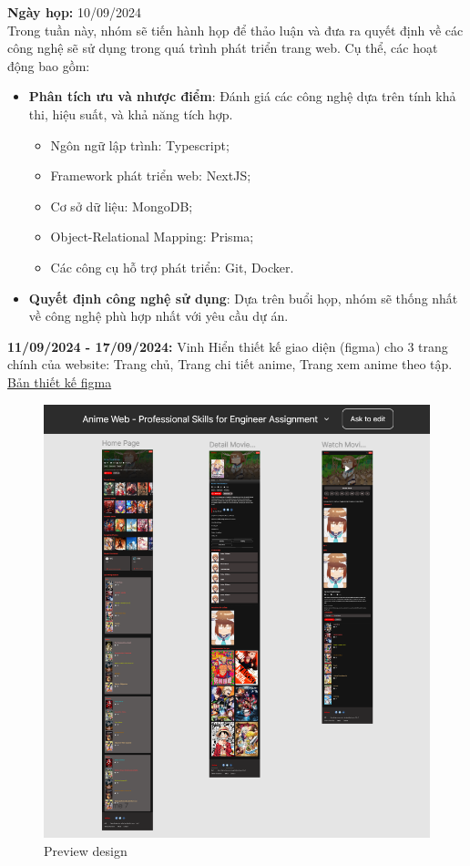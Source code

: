 \textbf{Ngày họp:} 10/09/2024 \\
Trong tuần này, nhóm sẽ tiến hành họp để thảo luận và đưa ra quyết định về các công nghệ sẽ sử dụng trong quá trình phát triển trang web. Cụ thể, các hoạt động bao gồm:
\begin{itemize}
    \item \textbf{Phân tích ưu và nhược điểm}: Đánh giá các công nghệ dựa trên tính khả thi, hiệu suất, và khả năng tích hợp.
    \begin{itemize}
        \item Ngôn ngữ lập trình: Typescript;
        \item Framework phát triển web: NextJS;
        \item Cơ sở dữ liệu: MongoDB;
        \item Object-Relational Mapping: Prisma;
        \item Các công cụ hỗ trợ phát triển: Git, Docker.
    \end{itemize}
    \item \textbf{Quyết định công nghệ sử dụng}: Dựa trên buổi họp, nhóm sẽ thống nhất về công nghệ phù hợp nhất với yêu cầu dự án.
\end{itemize}
\textbf{11/09/2024 - 17/09/2024:} Vinh Hiển thiết kế giao diện (figma) cho 3 trang chính của website: Trang chủ, Trang chi tiết anime, Trang xem anime theo tập. \href{https://www.figma.com/design/J4VbkPcCrv7e07qyR7bimC/Anime-Web---Professional-Skills-for-Engineer-Assignment?node-id=0-1\&t=3CpS6XH3ANF1a3Fo-0}{Bản thiết kế figma}
\\
\begin{figure}[H]
    \centering
    \includegraphics[width=0.5\linewidth]{content/planning/image/figma.png}
    \caption{Preview design}
    \label{fig:enter-label}
\end{figure}

